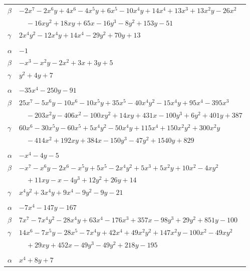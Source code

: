 \documentclass[11pt]{article}
\begin{document}
\begin{longtable}{@{}ll@{}}
$\beta$ & $-2x^{7}-2x^{6}y+4x^{6}-4x^{5}y+6x^{5}-10x^{4}y+14x^{4}+13x^{3}+13x^{2}y-26x^{2}$\\
 & $\quad -16xy^{2}+18xy+65x-16y^{3}-8y^{2}+153y-51$\\
$\gamma$ & $2x^{4}y^{2}-12x^{4}y+14x^{4}-29y^{2}+70y+13$\\
\addlinespace[3pt]
\multicolumn{2}{@{}l}{$\{i,j\}=\{15,23\}$, $k_{ij}=2\cdot 3^{2}$}\\
$\alpha$ & $-1$\\
$\beta$ & $-x^{3}-x^{2}y-2x^{2}+3x+3y+5$\\
$\gamma$ & $y^{2}+4y+7$\\
\addlinespace[3pt]
\multicolumn{2}{@{}l}{$\{i,j\}=\{15,24\}$, $k_{ij}=2^{2}\cdot 3^{2}$}\\
$\alpha$ & $-35x^{4}-250y-91$\\
$\beta$ & $25x^{7}-5x^{6}y-10x^{6}-10x^{5}y+35x^{5}-40x^{4}y^{2}-15x^{4}y+95x^{4}-395x^{3}$\\
 & $\quad -203x^{2}y-406x^{2}-100xy^{2}+14xy+431x-100y^{3}+6y^{2}+401y+387$\\
$\gamma$ & $60x^{6}-30x^{5}y-60x^{5}+5x^{4}y^{2}-50x^{4}y+115x^{4}+150x^{2}y^{2}+300x^{2}y$\\
 & $\quad -414x^{2}+192xy+384x-150y^{3}-47y^{2}+1540y+829$\\
\addlinespace[3pt]
\multicolumn{2}{@{}l}{$\{i,j\}=\{15,28\}$, $k_{ij}=2^{2}\cdot 3$}\\
$\alpha$ & $-x^{4}-4y-5$\\
$\beta$ & $-x^{7}-x^{6}y-2x^{6}-x^{5}y+5x^{5}-2x^{4}y^{2}+5x^{3}+5x^{2}y+10x^{2}-4xy^{2}$\\
 & $\quad +11xy-x-4y^{3}+12y^{2}+26y+14$\\
$\gamma$ & $x^{4}y^{2}+3x^{4}y+9x^{4}-9y^{2}-9y-21$\\
\addlinespace[3pt]
\multicolumn{2}{@{}l}{$\{i,j\}=\{15,30\}$, $k_{ij}=2\cdot 3^{4}$}\\
$\alpha$ & $-7x^{4}-147y-167$\\
$\beta$ & $7x^{7}-7x^{4}y^{2}-28x^{4}y+63x^{4}-176x^{3}+357x-98y^{3}+29y^{2}+851y-100$\\
$\gamma$ & $14x^{6}-7x^{5}y-28x^{5}-7x^{4}y+42x^{4}+49x^{2}y^{2}+147x^{2}y-100x^{2}-49xy^{2}$\\
 & $\quad +29xy+452x-49y^{3}-49y^{2}+218y-195$\\
\addlinespace[3pt]
\multicolumn{2}{@{}l}{$\{i,j\}=\{15,35\}$, $k_{ij}=2^{3}\cdot 3^{3}$}\\
$\alpha$ & $x^{4}+8y+7$\\

\end{longtable}
\end{document}
